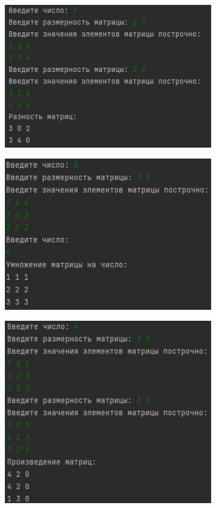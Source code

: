 \documentclass[bachelor, och, labwork]{shiza}
\begin{document}
        \begin{figure}[H]
            \centering
            \includegraphics[width=0.8\textwidth]{pic/9.png}
            \caption{}
        \end{figure}

        \begin{figure}[H]
            \centering
            \includegraphics[width=0.8\textwidth]{pic/10.png}
            \caption{}
        \end{figure}

        \begin{figure}[H]
            \centering
            \includegraphics[width=0.8\textwidth]{pic/11.png}
            \caption{}
        \end{figure}
\end{document}
